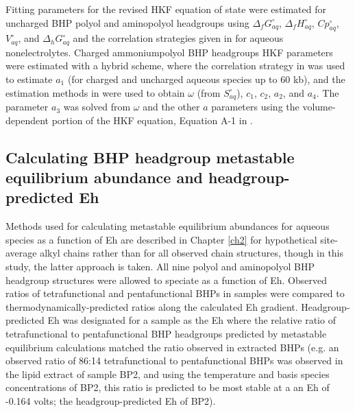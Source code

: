 Fitting parameters for the revised HKF equation of state were estimated for uncharged BHP polyol and aminopolyol headgroups using $\Delta_{f}G^{\circ}_{aq}$, $\Delta_{f}H^{\circ}_{aq}$, $Cp^{\circ}_{aq}$, $V^{\circ}_{aq}$, and $\Delta_{h}G^{\circ}_{aq}$ and the correlation strategies given in \cite{plyasunov2001correlation} for aqueous nonelectrolytes. Charged ammoniumpolyol BHP headgroups HKF parameters were estimated with a hybrid scheme, where the correlation strategy in \cite{sverjensky2014water} was used to estimate $a_{1}$ (for charged and uncharged aqueous species up to 60 kb), and the estimation methods in \cite{shock1990calculation} were used to obtain $\omega$ (from $S^{\circ}_{aq}$), $c_{1}$, $c_{2}$, $a_{2}$, and $a_{4}$. The parameter $a_{3}$ was solved from $\omega$ and the other $a$ parameters using the volume-dependent portion of the HKF equation, Equation A-1 in \cite{tanger1988calculation}.

\subsection{Calculating BHP headgroup metastable equilibrium abundance and headgroup-predicted Eh}

Methods used for calculating metastable equilibrium abundances for aqueous species as a function of Eh are described in Chapter \ref{ch2} for hypothetical site-average alkyl chains rather than for all observed chain structures, though in this study, the latter approach is taken. All nine polyol and aminopolyol BHP headgroup structures were allowed to speciate as a function of Eh. Observed ratios of tetrafunctional and pentafunctional BHPs in samples were compared to thermodynamically-predicted ratios along the calculated Eh gradient. Headgroup-predicted Eh was designated for a sample as the Eh where the relative ratio of tetrafunctional to pentafunctional BHP headgroups predicted by metastable equilibrium calculations matched the ratio observed in extracted BHPs (e.g. an observed ratio of 86:14 tetrafunctional to pentafunctional BHPs was observed in the lipid extract of sample BP2, and using the temperature and basis species concentrations of BP2, this ratio is predicted to be most stable at a an Eh of -0.164 volts; the headgroup-predicted Eh of BP2).



